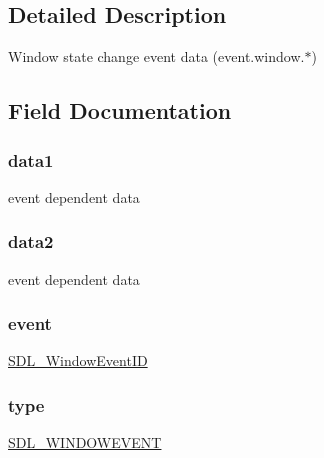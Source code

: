 \subsection{Detailed Description}
Window state change event data (event.\+window.$\ast$) 

\subsection{Field Documentation}
\subsubsection[{\texorpdfstring{data1}{data1}}]{ data1}\hypertarget{struct_s_d_l___window_event_a5bece3f0001ebcf1df7ff849ba3cd075}{}\label{struct_s_d_l___window_event_a5bece3f0001ebcf1df7ff849ba3cd075}
event dependent data 
\subsubsection[{\texorpdfstring{data2}{data2}}]{ data2}\hypertarget{struct_s_d_l___window_event_ad6f74222e0343d2037d61e09355595c2}{}\label{struct_s_d_l___window_event_ad6f74222e0343d2037d61e09355595c2}
event dependent data 
\subsubsection[{\texorpdfstring{event}{event}}]{ event}\hypertarget{struct_s_d_l___window_event_a3e1cf32cd85f71fa3040d99d2eae0cb5}{}\label{struct_s_d_l___window_event_a3e1cf32cd85f71fa3040d99d2eae0cb5}
\hyperlink{_s_d_l__video_8h_ac486b40a4860d980dbc74d0b4adf3bab}{S\+D\+L\+\_\+\+Window\+Event\+ID} 
\subsubsection[{\texorpdfstring{type}{type}}]{ type}\hypertarget{struct_s_d_l___window_event_aa40a9b05c3154032b9f2d7220e9f08dc}{}\label{struct_s_d_l___window_event_aa40a9b05c3154032b9f2d7220e9f08dc}
\hyperlink{_s_d_l__events_8h_a3b589e89be6b35c02e0dd34a55f3fccaa5ff4e41f0d8b5def11cfe6a69ec0b698}{S\+D\+L\+\_\+\+W\+I\+N\+D\+O\+W\+E\+V\+E\+NT} 
